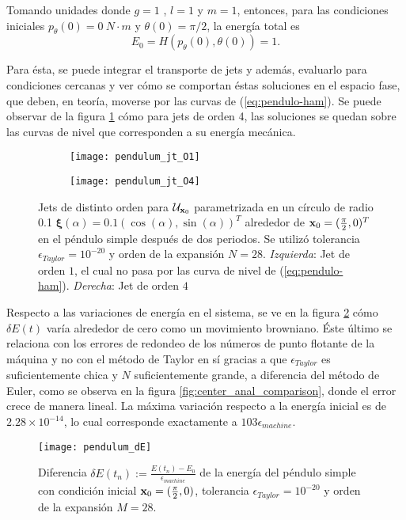 Tomando unidades donde $g = 1 $ , $l=1$ y $m=1$,  entonces, para las condiciones iniciales $p_{\theta}(0) = 0 \ N \cdot m$ y $\theta(0) = \pi/2$, la energía total es 
\begin{equation*}
E_0 = H(p_{\theta}(0),\theta (0) ) = 1.
\end{equation*}

Para ésta, se puede integrar el transporte de jets y además, evaluarlo para condiciones cercanas y ver cómo se comportan éstas soluciones en el espacio fase, que deben, en teoría, moverse por las curvas de (\ref{eq:pendulo-ham}). Se puede observar de la figura \ref{fig:pendulum_jt} cómo para jets de orden 4, las soluciones se quedan sobre las curvas de nivel que corresponden a su energía mecánica.

\begin{figure}[h!]
\centering
\begin{subfigure}{0.49\textwidth}
	\centering
	\texttt{[image: pendulum\_jt\_O1]}
\end{subfigure}
%
\begin{subfigure}{0.49\textwidth}
	\centering
	\texttt{[image: pendulum\_jt\_O4]}
\end{subfigure}
\caption{Jets de distinto orden para $\mathcal{U}_{\mathbf{x}_0}$ parametrizada en un círculo de radio 0.1 $\mathbf{\xi}(\alpha) = 0.1\left( \cos(\alpha),\sin(\alpha) \right)^T$ alrededor de $\mathbf{x}_0 = (\frac{\pi}{2},0)^T$ en el péndulo simple después de dos periodos. Se utilizó tolerancia $\epsilon_{Taylor} = 10^{-20}$ y orden de la expansión $N = 28$. \textit{Izquierda}: Jet de orden $1$, el cual no pasa por las curva de nivel de (\ref{eq:pendulo-ham}). \textit{Derecha}: Jet de orden $4$}
\label{fig:pendulum_jt}
\end{figure}

Respecto a las variaciones de energía en el sistema, se ve en la figura \ref{fig:pendulum_dE} cómo $\delta E(t)$ varía alrededor de cero como un movimiento browniano. Éste último se relaciona con los errores de redondeo de los números de punto flotante de la máquina y no con el método de Taylor en sí gracias a que $\epsilon_{Taylor}$ es suficientemente chica y $N$ suficientemente grande, a diferencia del método de Euler, como se observa en la figura \ref{fig:center_anal_comparison}, donde el error crece de manera lineal. La máxima variación respecto a la energía inicial es de $2.28\times10^{-14}$, lo cual corresponde exactamente a $103 \epsilon_{machine}$.

\begin{figure}[h!]
 \centering
 \texttt{[image: pendulum\_dE]}
 \caption{Diferencia $\delta E(t_n) := \frac{E(t_n) - E_0}{\epsilon_{machine}}$ de la energía del péndulo simple con condición inicial $\mathbf{x}_0 = (\frac{\pi}{2},0)$, tolerancia $\epsilon_{Taylor} = 10^{-20}$ y orden de la expansión $M = 28$.}
 \label{fig:pendulum_dE}
\end{figure}


